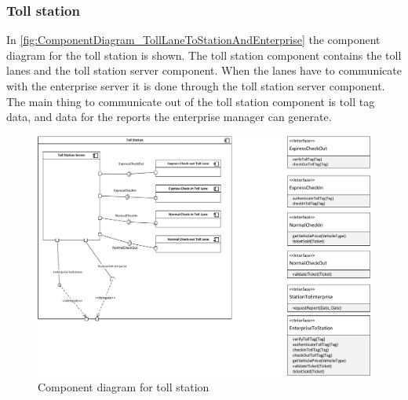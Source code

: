 \subsubsection*{Toll station}
In \autoref{fig:ComponentDiagram_TollLaneToStationAndEnterprise} the component diagram for the toll station is shown. The toll station component contains the toll lanes and the toll station server component. When the lanes have to communicate with the enterprise server it is done through the toll station server component. The main thing to communicate out of the toll station component is toll tag data, and data for the reports the enterprise manager can generate.
\begin{figure}
\centering
\includegraphics[width=1\textwidth]{img/component_diagrams/ComponentDiagram_TollLaneToStationAndEnterprise}
\caption{Component diagram for toll station}
\label{fig:ComponentDiagram_TollLaneToStationAndEnterprise}
\end{figure}

